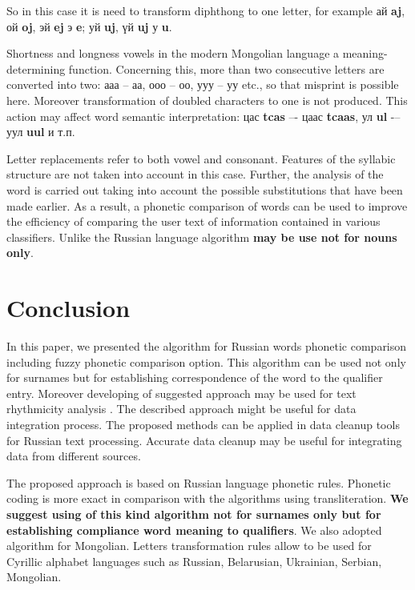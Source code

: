 \documentclass{svproc}
\begin{document}
So in this case it is need to transform diphthong to one letter, for example ай \textbf{aj}, ой \textbf{oj}, эй \textbf{ej} \rightarrow э \textbf{e}; уй \textbf{uj}, үй \textbf{uj} \rightarrow у \textbf{u}.

Shortness and longness vowels in the modern Mongolian language a meaning-determining function. Concerning this, more than two consecutive letters are converted into two: ааа -- аа, ооо -- оо, ууу -- уу etc., so that misprint is possible here. Moreover transformation of doubled characters to one is not produced. This action may affect word semantic interpretation: цас \textbf{tcas} –- цаас \textbf{tcaas}, ул \textbf{ul} -– уул \textbf{uul} и т.п.

Letter replacements refer to both vowel and consonant. Features of the syllabic structure are not taken into account in this case.
Further, the analysis of the word is carried out taking into account the possible substitutions that have been made earlier. As a result, a phonetic comparison of words can be used to improve the efficiency of comparing the user text of information contained in various classifiers. Unlike the Russian language algorithm \textbf{may be use not for nouns only}.

\section{Conclusion}
In this paper, we presented the algorithm for Russian words phonetic comparison including fuzzy phonetic comparison option. This algorithm can be used not only for surnames but for establishing correspondence of the word to the qualifier entry. Moreover developing of suggested approach may be used for text rhythmicity analysis \cite{Damasevichius}. The described approach might be useful for data integration process. The proposed methods can be applied in data cleanup tools for Russian text processing. Accurate data cleanup may be useful for integrating data from different sources.

The proposed approach is based on Russian language phonetic rules. Phonetic coding is more exact in comparison with the algorithms using transliteration. \textbf{We suggest using of this kind algorithm not for surnames only but for establishing compliance word meaning to qualifiers}. We also adopted algorithm for Mongolian. Letters transformation rules allow to be used for Cyrillic alphabet languages such as Russian, Belarusian, Ukrainian, Serbian, Mongolian.

\end{document}
